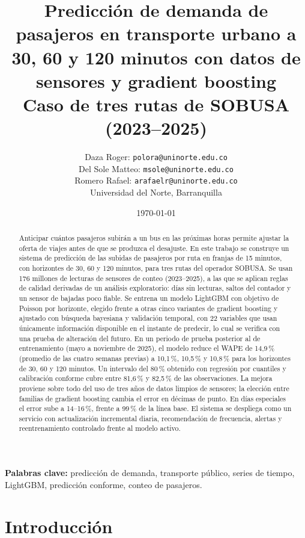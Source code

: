 \documentclass[11pt,a4paper]{article}
\title{\textbf{Predicción de demanda de pasajeros en transporte urbano a 30, 60 y 120 minutos con datos de sensores y gradient boosting}\\[0.4em]
\large Caso de tres rutas de SOBUSA (2023--2025)}
\author{Daza Roger: \texttt{polora@uninorte.edu.co}\\
Del Sole Matteo: \texttt{msole@uninorte.edu.co}\\
Romero Rafael: \texttt{arafaelr@uninorte.edu.co}\\[0.3em]
\small Universidad del Norte, Barranquilla}
\date{\today}
\begin{document}
\maketitle

\begin{abstract}
Anticipar cuántos pasajeros subirán a un bus en las próximas horas permite ajustar la oferta de viajes antes de que se produzca el desajuste. En este trabajo se construye un sistema de predicción de las subidas de pasajeros por ruta en franjas de 15 minutos, con horizontes de 30, 60 y 120 minutos, para tres rutas del operador SOBUSA. Se usan 176 millones de lecturas de sensores de conteo (2023--2025), a las que se aplican reglas de calidad derivadas de un análisis exploratorio: días sin lecturas, saltos del contador y un sensor de bajadas poco fiable. Se entrena un modelo LightGBM con objetivo de Poisson por horizonte, elegido frente a otras cinco variantes de gradient boosting y ajustado con búsqueda bayesiana y validación temporal, con 22 variables que usan únicamente información disponible en el instante de predecir, lo cual se verifica con una prueba de alteración del futuro. En un periodo de prueba posterior al de entrenamiento (mayo a noviembre de 2025), el modelo reduce el WAPE de 14,9\,\% (promedio de las cuatro semanas previas) a 10,1\,\%, 10,5\,\% y 10,8\,\% para los horizontes de 30, 60 y 120 minutos. Un intervalo del 80\,\% obtenido con regresión por cuantiles y calibración conforme cubre entre 81,6\,\% y 82,5\,\% de las observaciones. La mejora proviene sobre todo del uso de tres años de datos limpios de sensores; la elección entre familias de gradient boosting cambia el error en décimas de punto. En días especiales el error sube a 14--16\,\%, frente a 99\,\% de la línea base. El sistema se despliega como un servicio con actualización incremental diaria, recomendación de frecuencia, alertas y reentrenamiento controlado frente al modelo activo.
\end{abstract}

\noindent\textbf{Palabras clave:} predicción de demanda, transporte público, series de tiempo, LightGBM, predicción conforme, conteo de pasajeros.

\section{Introducción}
\end{document}
